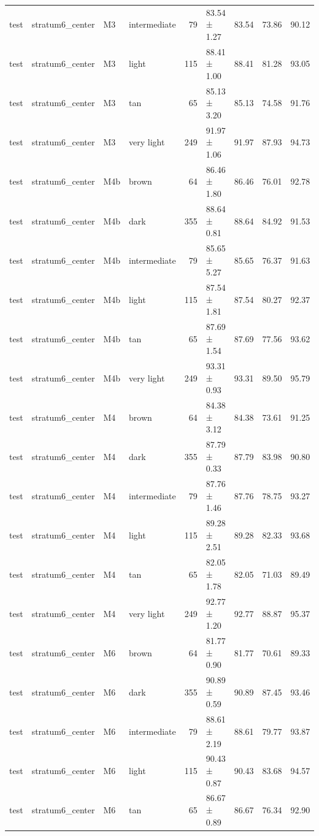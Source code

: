 \begin{tabular}{llllrlrrr}
test & stratum6\_center & M3 & intermediate & 79 & 83.54 ± 1.27 & 83.54 & 73.86 & 90.12 \\
test & stratum6\_center & M3 & light & 115 & 88.41 ± 1.00 & 88.41 & 81.28 & 93.05 \\
test & stratum6\_center & M3 & tan & 65 & 85.13 ± 3.20 & 85.13 & 74.58 & 91.76 \\
test & stratum6\_center & M3 & very light & 249 & 91.97 ± 1.06 & 91.97 & 87.93 & 94.73 \\
test & stratum6\_center & M4b & brown & 64 & 86.46 ± 1.80 & 86.46 & 76.01 & 92.78 \\
test & stratum6\_center & M4b & dark & 355 & 88.64 ± 0.81 & 88.64 & 84.92 & 91.53 \\
test & stratum6\_center & M4b & intermediate & 79 & 85.65 ± 5.27 & 85.65 & 76.37 & 91.63 \\
test & stratum6\_center & M4b & light & 115 & 87.54 ± 1.81 & 87.54 & 80.27 & 92.37 \\
test & stratum6\_center & M4b & tan & 65 & 87.69 ± 1.54 & 87.69 & 77.56 & 93.62 \\
test & stratum6\_center & M4b & very light & 249 & 93.31 ± 0.93 & 93.31 & 89.50 & 95.79 \\
test & stratum6\_center & M4 & brown & 64 & 84.38 ± 3.12 & 84.38 & 73.61 & 91.25 \\
test & stratum6\_center & M4 & dark & 355 & 87.79 ± 0.33 & 87.79 & 83.98 & 90.80 \\
test & stratum6\_center & M4 & intermediate & 79 & 87.76 ± 1.46 & 87.76 & 78.75 & 93.27 \\
test & stratum6\_center & M4 & light & 115 & 89.28 ± 2.51 & 89.28 & 82.33 & 93.68 \\
test & stratum6\_center & M4 & tan & 65 & 82.05 ± 1.78 & 82.05 & 71.03 & 89.49 \\
test & stratum6\_center & M4 & very light & 249 & 92.77 ± 1.20 & 92.77 & 88.87 & 95.37 \\
test & stratum6\_center & M6 & brown & 64 & 81.77 ± 0.90 & 81.77 & 70.61 & 89.33 \\
test & stratum6\_center & M6 & dark & 355 & 90.89 ± 0.59 & 90.89 & 87.45 & 93.46 \\
test & stratum6\_center & M6 & intermediate & 79 & 88.61 ± 2.19 & 88.61 & 79.77 & 93.87 \\
test & stratum6\_center & M6 & light & 115 & 90.43 ± 0.87 & 90.43 & 83.68 & 94.57 \\
test & stratum6\_center & M6 & tan & 65 & 86.67 ± 0.89 & 86.67 & 76.34 & 92.90 \\

\end{tabular}

